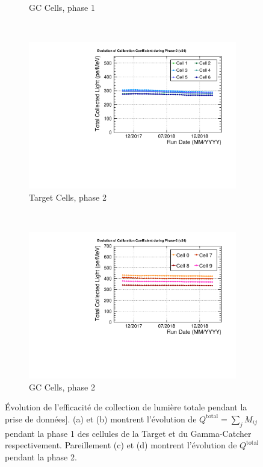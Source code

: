 {\begin{figure}[h!]
\begin{subfigure}[b]{0.49\textwidth}
\caption{GC Cells, phase 1}
\label{fig:LY_running_GC_p1.pdf}
\end{subfigure}
~ %
\begin{subfigure}[b]{0.49\textwidth}
\centering
\includegraphics[width=1\textwidth]{images/LY_running_T_p2.pdf}
\caption{Target Cells, phase 2}
\label{fig:LY_running_T_p2.pdf}
\end{subfigure}
~ %
\begin{subfigure}[b]{0.49\textwidth}
\centering
\includegraphics[width=1\textwidth]{images/LY_running_GC_p2.pdf}
\caption{GC Cells, phase 2}
\label{fig:LY_running_GC_p2.pdf}
\end{subfigure}
  \caption[Évolution de l'efficacité de collection de lumière totale  pendant la prise de données]{Évolution de l'efficacité de collection de lumière totale  pendant la prise de données]. (a) et (b) montrent l'évolution de $Q^\textrm{total} = \sum_j M_{ij}$ pendant la phase 1 des cellules de la Target et du Gamma-Catcher respectivement. Pareillement (c) et (d) montrent l'évolution de $Q^\textrm{total}$ pendant la phase 2.}
  \label{fig:LY_vs_time}
\end{figure}

}

